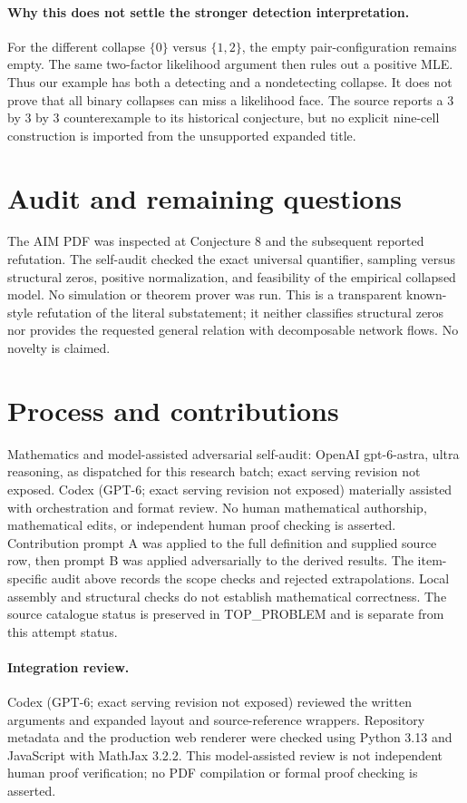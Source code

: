 \documentclass[11pt]{article}
\begin{document}
\paragraph{Why this does not settle the stronger detection interpretation.}
For the different collapse $\{0\}$ versus $\{1,2\}$, the empty
pair-configuration remains empty. The same two-factor likelihood argument
then rules out a positive MLE. Thus our example has both a detecting
and a nondetecting collapse. It does not prove that all binary collapses
can miss a likelihood face. The source reports a $3$ by $3$ by $3$
counterexample to its historical conjecture, but no explicit nine-cell
construction is imported from the unsupported expanded title.

\section{Audit and remaining questions}
The AIM PDF was inspected at Conjecture 8 and the subsequent reported
refutation. The self-audit checked the exact universal quantifier,
sampling versus structural zeros, positive normalization, and feasibility
of the empirical collapsed model. No simulation or theorem prover was run.
This is a transparent known-style refutation of the literal substatement;
it neither classifies structural zeros nor provides the requested general
relation with decomposable network flows. No novelty is claimed.

\section{Process and contributions}
Mathematics and model-assisted adversarial self-audit: OpenAI gpt-6-astra, ultra reasoning, as dispatched for this research batch; exact serving revision not exposed. Codex (GPT-6; exact serving revision not exposed) materially assisted with orchestration and format review. No human mathematical authorship, mathematical edits, or independent human proof checking is asserted.
Contribution prompt A was applied to the full definition and supplied source row, then prompt B was applied adversarially to the derived results. The item-specific audit above records the scope checks and rejected extrapolations. Local assembly and structural checks do not establish mathematical correctness. The source catalogue status is preserved in TOP\_PROBLEM and is separate from this attempt status.
\paragraph{Integration review.} Codex (GPT-6; exact serving revision not exposed) reviewed the written arguments and expanded layout and source-reference wrappers. Repository metadata and the production web renderer were checked using Python 3.13 and JavaScript with MathJax 3.2.2. This model-assisted review is not independent human proof verification; no PDF compilation or formal proof checking is asserted.
\end{document}
